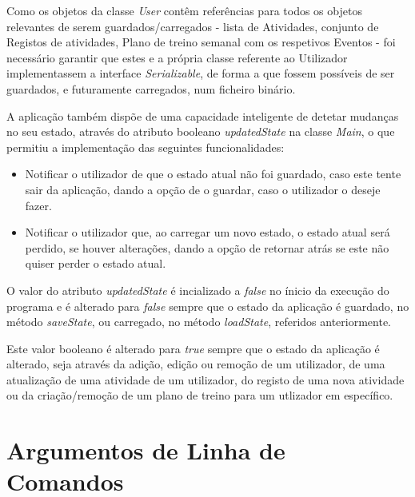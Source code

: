 \documentclass[a4paper,12pt]{scrreprt}
\begin{document}
Como os objetos da classe \textit{User} contêm referências para todos os objetos relevantes de serem guardados/carregados - lista de Atividades, conjunto de Registos de atividades, Plano de treino semanal com os respetivos Eventos - foi necessário garantir que estes e a própria classe referente ao Utilizador implementassem a interface \textit{Serializable}, de forma a que fossem possíveis de ser guardados, e futuramente carregados, num ficheiro binário.

A aplicação também dispõe de uma capacidade inteligente de detetar mudanças no seu estado, através do atributo booleano \textit{updatedState} na classe \textit{Main}, o que permitiu a implementação das seguintes funcionalidades:

\begin{itemize}
    \item Notificar o utilizador de que o estado atual não foi guardado, caso este tente sair da aplicação, dando a opção de o guardar, caso o utilizador o deseje fazer.
    \item Notificar o utilizador que, ao carregar um novo estado, o estado atual será perdido, se houver alterações, dando a opção de retornar atrás se este não quiser perder o estado atual.
\end{itemize}

O valor do atributo \textit{updatedState} é incializado a \textit{false} no ínicio da execução do programa e é alterado para \textit{false} sempre que o estado da aplicação é guardado, no método \textit{saveState}, ou carregado, no método \textit{loadState}, referidos anteriormente.

Este valor booleano é alterado para \textit{true} sempre que o estado da aplicação é alterado, seja através da adição, edição ou remoção de um utilizador, de uma atualização de uma atividade de um utilizador, do registo de uma nova atividade ou da criação/remoção de um plano de treino para um utlizador em específico.

\section{Argumentos de Linha de Comandos}


\end{document}
